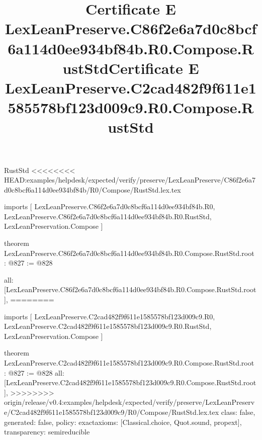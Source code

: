 \begin{lexlean}{RustStd}
<<<<<<<< HEAD:examples/helpdesk/expected/verify/preserve/LexLeanPreserve/C86f2e6a7d0c8bcf6a114d0ee934bf84b/R0/Compose/RustStd.lex.tex
\title{Certificate E LexLeanPreserve.C86f2e6a7d0c8bcf6a114d0ee934bf84b.R0.Compose.RustStd}
\begin{coremodule}
imports [
  LexLeanPreserve.C86f2e6a7d0c8bcf6a114d0ee934bf84b.R0,
  LexLeanPreserve.C86f2e6a7d0c8bcf6a114d0ee934bf84b.R0.RustStd,
  LexLeanPreservation.Compose
]

theorem LexLeanPreserve.C86f2e6a7d0c8bcf6a114d0ee934bf84b.R0.Compose.RustStd.root : @827 := @828 {
  all: [LexLeanPreserve.C86f2e6a7d0c8bcf6a114d0ee934bf84b.R0.Compose.RustStd.root],
========
\title{Certificate E LexLeanPreserve.C2cad482f9f611e1585578bf123d009c9.R0.Compose.RustStd}
\begin{coremodule}
imports [
  LexLeanPreserve.C2cad482f9f611e1585578bf123d009c9.R0,
  LexLeanPreserve.C2cad482f9f611e1585578bf123d009c9.R0.RustStd,
  LexLeanPreservation.Compose
]

theorem LexLeanPreserve.C2cad482f9f611e1585578bf123d009c9.R0.Compose.RustStd.root : @827 := @828 {
  all: [LexLeanPreserve.C2cad482f9f611e1585578bf123d009c9.R0.Compose.RustStd.root],
>>>>>>>> origin/release/v0.4:examples/helpdesk/expected/verify/preserve/LexLeanPreserve/C2cad482f9f611e1585578bf123d009c9/R0/Compose/RustStd.lex.tex
  class: false,
  generated: false,
  policy: exact{axioms: [Classical.choice, Quot.sound, propext]},
  transparency: semireducible
}


\end{coremodule}}
\end{coremodule}
\end{lexlean}

